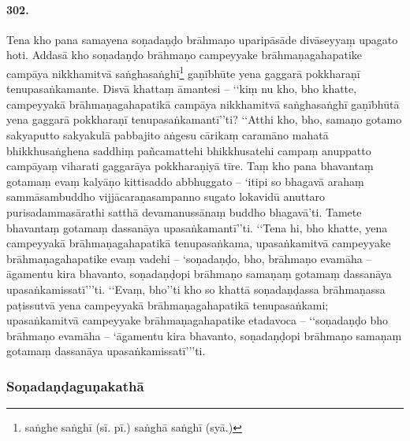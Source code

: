 \paragraph{302.} Tena kho pana samayena soṇadaṇḍo brāhmaṇo uparipāsāde divāseyyaṃ upagato hoti. Addasā kho soṇadaṇḍo brāhmaṇo campeyyake brāhmaṇagahapatike campāya nikkhamitvā saṅghasaṅghī\footnote{saṅghe saṅghī (sī. pī.) saṅghā saṅghī (syā.)} gaṇībhūte yena gaggarā pokkharaṇī tenupasaṅkamante. Disvā khattaṃ āmantesi – ‘‘kiṃ nu kho, bho khatte, campeyyakā brāhmaṇagahapatikā campāya nikkhamitvā saṅghasaṅghī gaṇībhūtā yena gaggarā pokkharaṇī tenupasaṅkamantī’’ti? ‘‘Atthi kho, bho, samaṇo gotamo sakyaputto sakyakulā pabbajito aṅgesu cārikaṃ caramāno mahatā bhikkhusaṅghena saddhiṃ pañcamattehi bhikkhusatehi campaṃ anuppatto campāyaṃ viharati gaggarāya pokkharaṇiyā tīre. Taṃ kho pana bhavantaṃ gotamaṃ evaṃ kalyāṇo kittisaddo abbhuggato – ‘itipi so bhagavā arahaṃ sammāsambuddho vijjācaraṇasampanno sugato lokavidū anuttaro purisadammasārathi satthā devamanussānaṃ buddho bhagavā’ti. Tamete bhavantaṃ gotamaṃ dassanāya upasaṅkamantī’’ti. ‘‘Tena hi, bho khatte, yena campeyyakā brāhmaṇagahapatikā tenupasaṅkama, upasaṅkamitvā campeyyake brāhmaṇagahapatike evaṃ vadehi – ‘soṇadaṇḍo, bho, brāhmaṇo evamāha – āgamentu kira bhavanto, soṇadaṇḍopi brāhmaṇo samaṇaṃ gotamaṃ dassanāya upasaṅkamissatī’’’ti. ‘‘Evaṃ, bho’’ti kho so khattā soṇadaṇḍassa brāhmaṇassa paṭissutvā yena campeyyakā brāhmaṇagahapatikā tenupasaṅkami; upasaṅkamitvā campeyyake brāhmaṇagahapatike etadavoca – ‘‘soṇadaṇḍo bho brāhmaṇo evamāha – ‘āgamentu kira bhavanto, soṇadaṇḍopi brāhmaṇo samaṇaṃ gotamaṃ dassanāya upasaṅkamissatī’’’ti.

\subsubsection{Soṇadaṇḍaguṇakathā}


